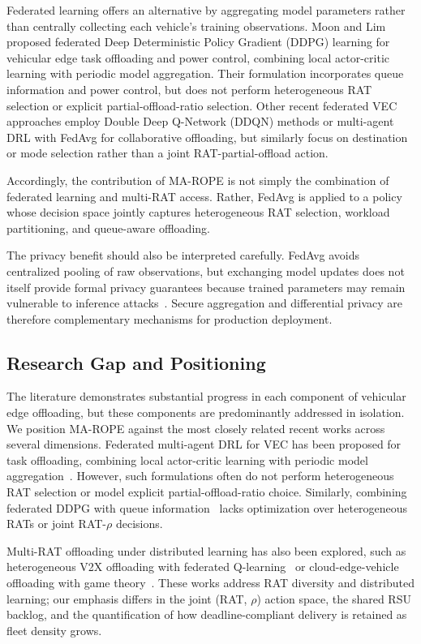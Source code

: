 Federated learning offers an alternative by aggregating model parameters rather than centrally collecting each vehicle's training observations. Moon and Lim~\cite{moonlim2022} proposed federated Deep Deterministic Policy Gradient (DDPG) learning for vehicular edge task offloading and power control, combining local actor-critic learning with periodic model aggregation. Their formulation incorporates queue information and power control, but does not perform heterogeneous RAT selection or explicit partial-offload-ratio selection. Other recent federated VEC approaches employ Double Deep Q-Network (DDQN) methods or multi-agent DRL with FedAvg for collaborative offloading, but similarly focus on destination or mode selection rather than a joint RAT-partial-offload action.

Accordingly, the contribution of MA-ROPE is not simply the combination of federated learning and multi-RAT access. Rather, FedAvg is applied to a policy whose decision space jointly captures heterogeneous RAT selection, workload partitioning, and queue-aware offloading.

The privacy benefit should also be interpreted carefully. FedAvg avoids centralized pooling of raw observations, but exchanging model updates does not itself provide formal privacy guarantees because trained parameters may remain vulnerable to inference attacks~\cite{zhu2019}. Secure aggregation and differential privacy are therefore complementary mechanisms for production deployment.

\subsection{Research Gap and Positioning}

The literature demonstrates substantial progress in each component of vehicular edge offloading, but these components are predominantly addressed in isolation. We position MA-ROPE against the most closely related recent works across several dimensions. Federated multi-agent DRL for VEC has been proposed for task offloading, combining local actor-critic learning with periodic model aggregation~\cite{zhao2024}. However, such formulations often do not perform heterogeneous RAT selection or model explicit partial-offload-ratio choice. Similarly, combining federated DDPG with queue information~\cite{moonlim2022} lacks optimization over heterogeneous RATs or joint RAT-$\rho$ decisions.

Multi-RAT offloading under distributed learning has also been explored, such as heterogeneous V2X offloading with federated Q-learning~\cite{xiong2021} or cloud-edge-vehicle offloading with game theory~\cite{guo2026}. These works address RAT diversity and distributed learning; our emphasis differs in the joint (RAT, $\rho$) action space, the shared RSU backlog, and the quantification of how deadline-compliant delivery is retained as fleet density grows.

